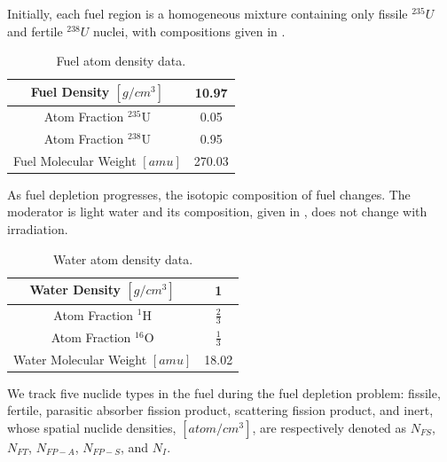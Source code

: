 Initially, each fuel region is a homogeneous mixture containing only fissile $^{235}U$ and fertile $^{238}U$ nuclei, with compositions given in .
\begin{table}[!htp]
\begin{center}
\begin{tabular}{|c|c|}
\hline
Fuel Density $[g/cm^3]$  & 10.97 \\
\hline
Atom Fraction $^{235}\text{U}$	& 0.05 \\
\hline
Atom Fraction $^{238}\text{U}$ & 0.95 \\
\hline
Fuel Molecular Weight $[amu]$ & 270.03\\
\hline
\end{tabular}
\end{center}
\caption{Fuel atom density data.}
\label{tbl:fuel_atom_density}
\end{table}
As fuel depletion progresses, the isotopic composition of fuel changes.
The moderator is light water and its composition, given in , does not change with irradiation.
\begin{table}[!htp]
\begin{center}
\begin{tabular}{|c|c|}
\hline
Water Density $[g/cm^3]$  & 1 \\
\hline
Atom Fraction $^1\text{H}$	& $\frac{2}{3}$ \\
\hline
Atom Fraction $^{16}\text{O}$ & $\frac{1}{3}$ \\
\hline
Water Molecular Weight $[amu]$ & 18.02\\
\hline
\end{tabular}
\end{center}
\caption{Water atom density data.}
\label{tbl:water_atom_density}
\end{table}
We track five nuclide types in the fuel during the fuel depletion problem: fissile, fertile, parasitic absorber fission product, scattering fission product, and inert, whose spatial nuclide densities, $[atom/cm^{3}]$, are respectively denoted as $N_{FS}$, $N_{FT}$, $N_{FP-A}$, $N_{FP-S}$, and $N_I$.

